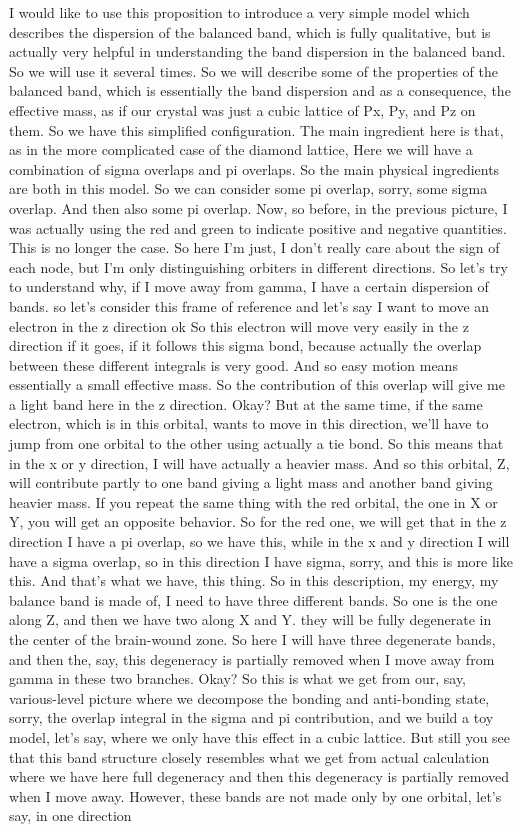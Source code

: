 I would like to use this proposition to introduce a very simple model which describes the dispersion of the balanced band, which is fully qualitative, but is actually very helpful in understanding the band dispersion in the balanced band. So we will use it several times. So we will describe some of the properties of the balanced band, which is essentially the band dispersion and as a consequence, the effective mass, as if our crystal was just a cubic lattice of Px, Py, and Pz on them. So we have this simplified configuration. The main ingredient here is that, as in the more complicated case of the diamond lattice, Here we will have a combination of sigma overlaps and pi overlaps. So the main physical ingredients are both in this model. So we can consider some pi overlap, sorry, some sigma overlap. And then also some pi overlap. Now, so before, in the previous picture, I was actually using the red and green to indicate positive and negative quantities. This is no longer the case. So here I'm just, I don't really care about the sign of each node, but I'm only distinguishing orbiters in different directions. So let's try to understand why, if I move away from gamma, I have a certain dispersion of bands. so let's consider this frame of reference and let's say I want to move an electron in the z direction ok So this electron will move very easily in the z direction if it goes, if it follows this sigma bond, because actually the overlap between these different integrals is very good. And so easy motion means essentially a small effective mass. So the contribution of this overlap will give me a light band here in the z direction. Okay? But at the same time, if the same electron, which is in this orbital, wants to move in this direction, we'll have to jump from one orbital to the other using actually a tie bond. So this means that in the x or y direction, I will have actually a heavier mass. And so this orbital, Z, will contribute partly to one band giving a light mass and another band giving heavier mass. If you repeat the same thing with the red orbital, the one in X or Y, you will get an opposite behavior. So for the red one, we will get that in the z direction I have a pi overlap, so we have this, while in the x and y direction I will have a sigma overlap, so in this direction I have sigma, sorry, and this is more like this. And that's what we have, this thing. So in this description, my energy, my balance band is made of, I need to have three different bands. So one is the one along Z, and then we have two along X and Y. they will be fully degenerate in the center of the brain-wound zone. So here I will have three degenerate bands, and then the, say, this degeneracy is partially removed when I move away from gamma in these two branches. Okay? So this is what we get from our, say, various-level picture where we decompose the bonding and anti-bonding state, sorry, the overlap integral in the sigma and pi contribution, and we build a toy model, let's say, where we only have this effect in a cubic lattice. But still you see that this band structure closely resembles what we get from actual calculation where we have here full degeneracy and then this degeneracy is partially removed when I move away. However, these bands are not made only by one orbital, let's say, in one direction 